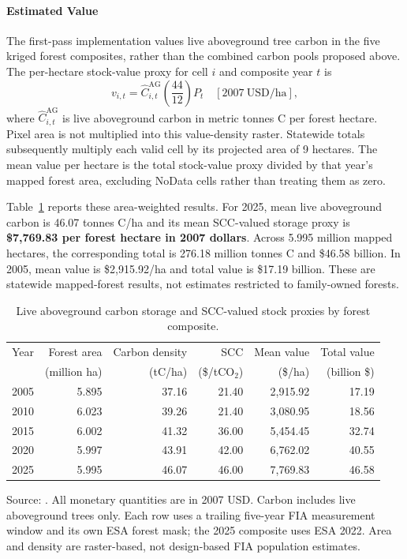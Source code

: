 \documentclass[11pt]{article}
\begin{document}
\paragraph{Estimated Value}

The first-pass implementation values live aboveground tree carbon in the five kriged forest composites, rather than the combined carbon pools proposed above. The per-hectare stock-value proxy for cell $i$ and composite year $t$ is
\begin{equation}
v_{i,t}=\widehat C^{\mathrm{AG}}_{i,t}\left(\frac{44}{12}\right)P_t
\quad [\mathrm{2007\ USD/ha}],
\label{eq:implemented-carbon-storage}
\end{equation}
where $\widehat C^{\mathrm{AG}}_{i,t}$ is live aboveground carbon in metric tonnes C per forest hectare. Pixel area is not multiplied into this value-density raster. Statewide totals subsequently multiply each valid cell by its projected area of 9 hectares. The mean value per hectare is the total stock-value proxy divided by that year's mapped forest area, excluding NoData cells rather than treating them as zero.

Table~\ref{tab:carbon-storage-results} reports these area-weighted results. For 2025, mean live aboveground carbon is 46.07 tonnes C/ha and its mean SCC-valued storage proxy is \textbf{\$7,769.83 per forest hectare in 2007 dollars}. Across 5.995 million mapped hectares, the corresponding total is 276.18 million tonnes C and \$46.58 billion. In 2005, mean value is \$2,915.92/ha and total value is \$17.19 billion. These are statewide mapped-forest results, not estimates restricted to family-owned forests.

\begin{table}[htbp]
\centering
\caption{Live aboveground carbon storage and SCC-valued stock proxies by forest composite.}
\label{tab:carbon-storage-results}
\small
\begin{tabular}{@{}rrrrrr@{}}
\toprule
Year & Forest area & Carbon density & SCC & Mean value & Total value \\
 & (million ha) & (tC/ha) & (\$/tCO$_2$) & (\$/ha) & (billion \$) \\
\midrule
2005 & 5.895 & 37.16 & 21.40 & 2,915.92 & 17.19 \\
2010 & 6.023 & 39.26 & 21.40 & 3,080.95 & 18.56 \\
2015 & 6.002 & 41.32 & 36.00 & 5,454.45 & 32.74 \\
2020 & 5.997 & 43.91 & 42.00 & 6,762.02 & 40.55 \\
2025 & 5.995 & 46.07 & 46.00 & 7,769.83 & 46.58 \\
\bottomrule
\end{tabular}

\smallskip
\begin{minipage}{0.95\linewidth}
\footnotesize Source: . All monetary quantities are in 2007 USD. Carbon includes live aboveground trees only. Each row uses a trailing five-year FIA measurement window and its own ESA forest mask; the 2025 composite uses ESA 2022. Area and density are raster-based, not design-based FIA population estimates.
\end{minipage}
\end{table}
\end{document}
